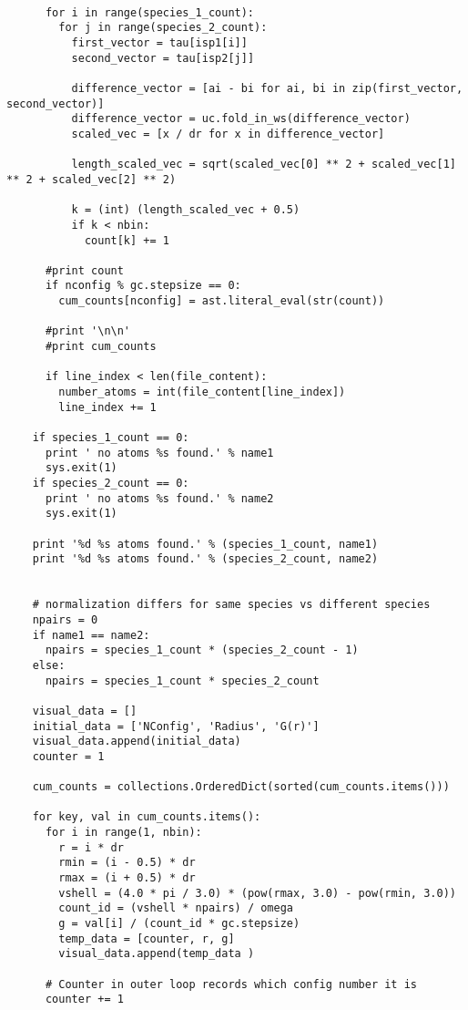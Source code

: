 \begin{verbatim}
          
      for i in range(species_1_count):
        for j in range(species_2_count):
          first_vector = tau[isp1[i]]
          second_vector = tau[isp2[j]]
          
          difference_vector = [ai - bi for ai, bi in zip(first_vector, second_vector)]
          difference_vector = uc.fold_in_ws(difference_vector)
          scaled_vec = [x / dr for x in difference_vector]
          
          length_scaled_vec = sqrt(scaled_vec[0] ** 2 + scaled_vec[1] ** 2 + scaled_vec[2] ** 2)
         
          k = (int) (length_scaled_vec + 0.5)
          if k < nbin:
            count[k] += 1
      
      #print count
      if nconfig % gc.stepsize == 0:
        cum_counts[nconfig] = ast.literal_eval(str(count))

      #print '\n\n'
      #print cum_counts
       
      if line_index < len(file_content):
        number_atoms = int(file_content[line_index])
        line_index += 1
    
    if species_1_count == 0:
      print ' no atoms %s found.' % name1
      sys.exit(1)
    if species_2_count == 0:
      print ' no atoms %s found.' % name2
      sys.exit(1)
  
    print '%d %s atoms found.' % (species_1_count, name1)
    print '%d %s atoms found.' % (species_2_count, name2)
  
        
    # normalization differs for same species vs different species
    npairs = 0
    if name1 == name2:
      npairs = species_1_count * (species_2_count - 1)
    else:
      npairs = species_1_count * species_2_count
    
    visual_data = []
    initial_data = ['NConfig', 'Radius', 'G(r)']
    visual_data.append(initial_data)
    counter = 1

    cum_counts = collections.OrderedDict(sorted(cum_counts.items()))

    for key, val in cum_counts.items():
      for i in range(1, nbin):
        r = i * dr
        rmin = (i - 0.5) * dr
        rmax = (i + 0.5) * dr
        vshell = (4.0 * pi / 3.0) * (pow(rmax, 3.0) - pow(rmin, 3.0))
        count_id = (vshell * npairs) / omega
        g = val[i] / (count_id * gc.stepsize)
        temp_data = [counter, r, g]
        visual_data.append(temp_data )
      
      # Counter in outer loop records which config number it is
      counter += 1
           

\end{verbatim}
